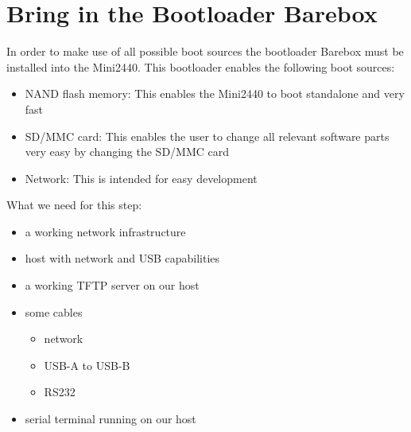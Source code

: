 %
%
%
%
%
%
%

\chapter{Bring in the Bootloader Barebox}	\label{sec:deploying}

In order to make use of all possible boot sources the bootloader Barebox must
be installed into the Mini2440. This bootloader enables the following boot
sources:

\begin{itemize}
	\item NAND flash memory: This enables the Mini2440 to boot standalone
	and very fast
	\item SD/MMC card: This enables the user to change all relevant
	software parts very easy by changing the SD/MMC card
	\item Network: This is intended for easy development
\end{itemize}

What we need for this step:

\begin{itemize}
 \item a working network infrastructure
 \item host with network and USB capabilities
 \item a working TFTP server on our host
 \item some cables
 \begin{itemize}
  \item network
  \item USB-A to USB-B
  \item RS232
 \end{itemize}
 \item serial terminal running on our host
\end{itemize}

